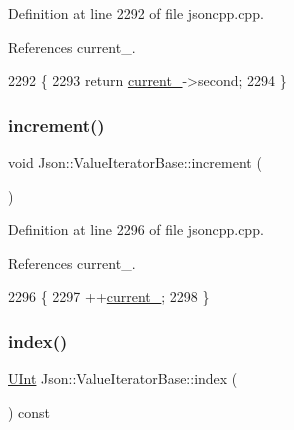 Definition at line 2292 of file jsoncpp.\+cpp.



References current\+\_\+.


\begin{DoxyCode}
2292                                       \{
2293   \textcolor{keywordflow}{return} \hyperlink{class_json_1_1_value_iterator_base_ab3138ce8af8301cca3b041ea55cb922a}{current\_}->second;
2294 \}
\end{DoxyCode}
\mbox{\label{class_json_1_1_value_iterator_base_afe58f9534e1fd2033419fd9fe244551e}} 
\subsubsection{\texorpdfstring{increment()}{increment()}}
{\footnotesize\ttfamily void Json\+::\+Value\+Iterator\+Base\+::increment (\begin{DoxyParamCaption}{ }\end{DoxyParamCaption})\hspace{0.3cm}{\ttfamily [protected]}}



Definition at line 2296 of file jsoncpp.\+cpp.



References current\+\_\+.


\begin{DoxyCode}
2296                                   \{
2297   ++\hyperlink{class_json_1_1_value_iterator_base_ab3138ce8af8301cca3b041ea55cb922a}{current\_};
2298 \}
\end{DoxyCode}
\mbox{\label{class_json_1_1_value_iterator_base_a549c66a0bd20e9ae772175a5c0d2e88a}} 
\subsubsection{\texorpdfstring{index()}{index()}}
{\footnotesize\ttfamily \hyperlink{namespace_json_a800fb90eb6ee8d5d62b600c06f87f7d4}{U\+Int} Json\+::\+Value\+Iterator\+Base\+::index (\begin{DoxyParamCaption}{ }\end{DoxyParamCaption}) const}



